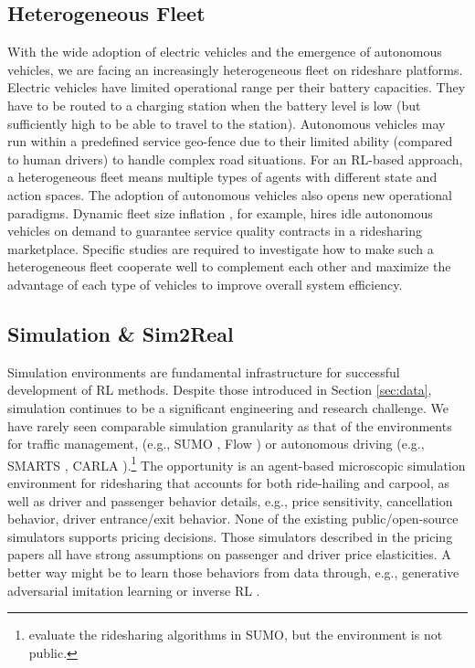 \documentclass{article}
\begin{document}
\subsection{Heterogeneous Fleet}
With the wide adoption of electric vehicles and the emergence of autonomous vehicles, we are facing an increasingly heterogeneous fleet on rideshare platforms.
Electric vehicles have limited operational range per their battery capacities. They have to be routed to a charging station when the battery level is low (but sufficiently high to be able to travel to the station). Autonomous vehicles may run within a predefined service geo-fence due to their limited ability (compared to human drivers) to handle complex road situations. For an RL-based approach, a heterogeneous fleet means multiple types of agents with different state and action spaces. The adoption of autonomous vehicles also opens new operational paradigms. Dynamic fleet size inflation \citep{beirigo2022business}, for example, hires idle autonomous vehicles on demand to guarantee service quality contracts in a ridesharing marketplace.
Specific studies are required to investigate how to make such a heterogeneous fleet cooperate well to complement each other and maximize the advantage of each type of vehicles to improve overall system efficiency.

\subsection{Simulation \& Sim2Real}
Simulation environments are fundamental infrastructure for successful development of RL methods. Despite those introduced in Section \ref{sec:data}, simulation continues to be a significant engineering and research challenge. We have rarely seen comparable simulation granularity as that of the environments for traffic management, (e.g., SUMO \citep{SUMO2018}, Flow \citep{wu2017flow}) or autonomous driving (e.g., SMARTS \citep{zhou2020smarts}, CARLA \citep{dosovitskiy2017carla}).\footnote{\cite{gueriau2020shared} evaluate the ridesharing algorithms in SUMO, but the environment is not public.} 
The opportunity is an agent-based microscopic simulation environment for ridesharing that accounts for both ride-hailing and carpool, as well as driver and passenger behavior details, e.g., price sensitivity, cancellation behavior, driver entrance/exit behavior. None of the existing public/open-source simulators supports pricing decisions. Those simulators described in the pricing papers all have strong assumptions on passenger and driver price elasticities.
A better way might be to learn those behaviors from data through, e.g., generative adversarial imitation learning \citep{shang2019environment} or inverse RL \citep{mazumdar2017gradient}.
\end{document}
